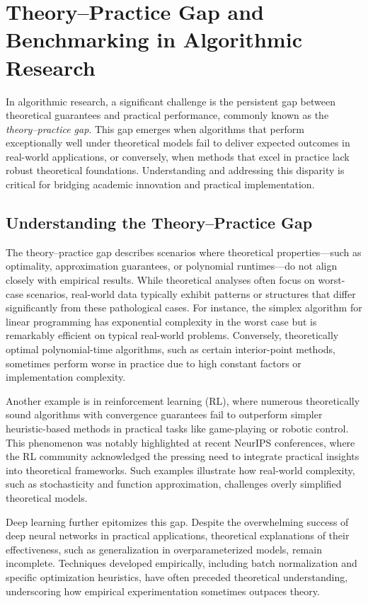 \section{Theory–Practice Gap and Benchmarking in Algorithmic Research}
\label{sec:theory_practice_benchmarking}

In algorithmic research, a significant challenge is the persistent
gap between theoretical guarantees and practical performance,
commonly known as the \emph{theory–practice gap}. This gap emerges
when algorithms that perform exceptionally well under theoretical
models fail to deliver expected outcomes in real-world applications,
or conversely, when methods that excel in practice lack robust
theoretical foundations. Understanding and addressing this disparity
is critical for bridging academic innovation and practical implementation.

\subsection{Understanding the Theory–Practice Gap}

The theory–practice gap describes scenarios where theoretical
properties—such as optimality, approximation guarantees, or
polynomial runtimes—do not align closely with empirical results.
While theoretical analyses often focus on worst-case scenarios,
real-world data typically exhibit patterns or structures that differ
significantly from these pathological cases. For instance, the
simplex algorithm for linear programming has exponential complexity
in the worst case but is remarkably efficient on typical real-world
problems. Conversely, theoretically optimal polynomial-time
algorithms, such as certain interior-point methods, sometimes perform
worse in practice due to high constant factors or implementation complexity.

Another example is in reinforcement learning (RL), where numerous
theoretically sound algorithms with convergence guarantees fail to
outperform simpler heuristic-based methods in practical tasks like
game-playing or robotic control. This phenomenon was notably
highlighted at recent NeurIPS conferences, where the RL community
acknowledged the pressing need to integrate practical insights into
theoretical frameworks. Such examples illustrate how real-world
complexity, such as stochasticity and function approximation,
challenges overly simplified theoretical models.

Deep learning further epitomizes this gap. Despite the overwhelming
success of deep neural networks in practical applications,
theoretical explanations of their effectiveness, such as
generalization in overparameterized models, remain incomplete.
Techniques developed empirically, including batch normalization and
specific optimization heuristics, have often preceded theoretical
understanding, underscoring how empirical experimentation sometimes
outpaces theory.

